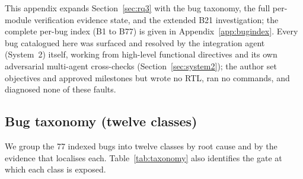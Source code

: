 \documentclass[acmtog,authorversion]{acmart}
\begin{document}
This appendix expands Section~\ref{sec:rq3} with the bug taxonomy, the full per-module verification evidence state, and the extended B21 investigation; the complete per-bug index (B1 to B77) is given in Appendix~\ref{app:bugindex}. Every bug catalogued here was surfaced and resolved by the integration agent (System~2) itself, working from high-level functional directives and its own adversarial multi-agent cross-checks (Section~\ref{sec:system2}); the author set objectives and approved milestones but wrote no RTL, ran no commands, and diagnosed none of these faults.

\subsection{Bug taxonomy (twelve classes)}

We group the 77 indexed bugs into twelve classes by root cause and by the evidence that localises each. Table~\ref{tab:taxonomy} also identifies the gate at which each class is exposed.
\end{document}
